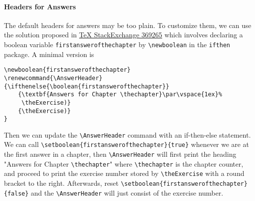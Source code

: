 \paragraph{Headers for Answers} The default headers for answers may be too plain. To customize them, we can use the solution proposed in \href{https://tex.stackexchange.com/questions/369265/math-book-how-to-write-exercise-and-answers}{\TeX{} StackExchange 369265} which involves declaring a boolean variable \texttt{firstanswerofthechapter} by \texttt{\textbackslash newboolean} in the \texttt{ifthen} package. A minimal version is
\begin{lstlisting}
\newboolean{firstanswerofthechapter}  
\renewcommand{\AnswerHeader}{\ifthenelse{\boolean{firstanswerofthechapter}}
    {\textbf{Answers for Chapter \thechapter}\par\vspace{1ex}%
     \theExercise)}
    {\theExercise)}
}
\end{lstlisting}
Then we can update the \texttt{\textbackslash AnswerHeader} command with an if-then-else statement. We can call \texttt{\textbackslash setboolean\{firstanswerofthechapter\}\{true\}} whenever we are at the first answer in a chapter, then \texttt{\textbackslash AnswerHeader} will first print the heading "Answers for Chapter \texttt{\textbackslash thechapter}" where \texttt{\textbackslash thechapter} is the chapter counter, and proceed to print the exercise number stored by \texttt{\textbackslash theExercise} with a round bracket to the right. Afterwards, reset \texttt{\textbackslash setboolean\{first\allowbreak answerofthechapter\}\{false\}} and the \texttt{\textbackslash AnswerHeader} will just consist of the exercise number.